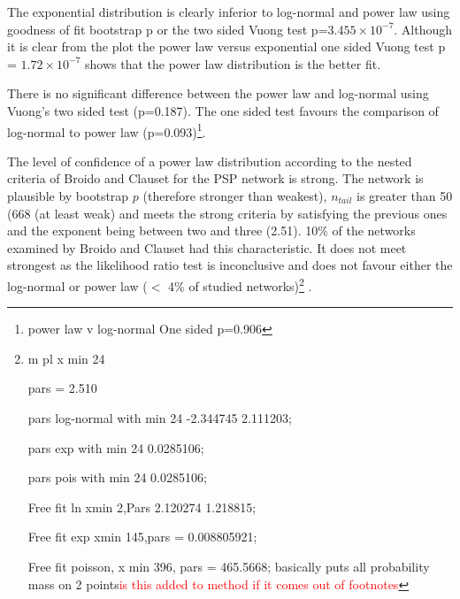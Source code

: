 
The exponential distribution is clearly inferior to log-normal and power law using goodness of fit bootstrap p or the two sided Vuong test p=$3.455\times10^{-7}$. Although it is clear from the plot the power law versus exponential one sided Vuong test p = $1.72\times10^{-7}$ shows that the power law distribution is the better fit. 

There is no significant difference between the power law and log-normal using Vuong's two sided test (p=0.187). The one sided test favours the comparison of log-normal to power law (p=0.093)\footnote{power law v log-normal One sided p=0.906}.  

The level of confidence of a power law distribution according to the nested criteria of Broido and Clauset\cite{broido2019scale} for the PSP network is strong. The network is plausible by bootstrap $p$ (therefore stronger than weakest), $n_{tail}$ is greater than 50 (668 (at least weak) and meets the strong criteria by satisfying the previous ones and the exponent being between two and three (2.51). 10\% of the networks examined by Broido and Clauset had this characteristic. It does not meet strongest as the likelihood ratio test is inconclusive and does not favour either the log-normal or power law ($<$ 4\% of studied networks)\footnote{m pl x min 24

pars = 2.510  

pars log-normal with min 24 -2.344745  2.111203;

pars exp with min 24 0.0285106;

pars pois with min 24 0.0285106;
 
 Free fit ln xmin 2,Pars 2.120274 1.218815;
 
 Free fit exp xmin 145,pars = 0.008805921;
 
 Free fit poisson, x min 396, pars = 465.5668;
  basically puts all probability mass on 2 points\textcolor{red}{is this added to method if it comes out of footnotes}}
  .  











